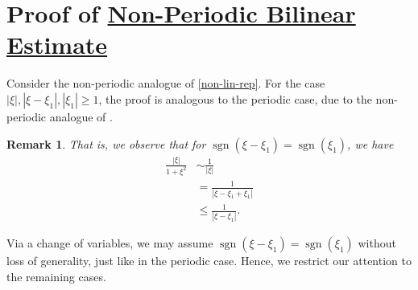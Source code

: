 \documentclass[12pt,reqno]{amsart}
\numberwithin{equation}{section}  %
\renewcommand{\cref}{\Cref}
\DeclareMathOperator{\sgn}{sgn}
\newtheorem{remark}[theorem]{Remark}
\begin{document}
\section{Proof of \hyperref[prop:bil]{Non-Periodic Bilinear Estimate}} 
Consider the non-periodic analogue of \eqref{non-lin-rep}. For the case $|\xi|, |\xi - \xi_{1}|, |\xi_{1}| \ge 1$, the proof is analogous to the periodic case, due to the non-periodic analogue of \cref{rem:key-trick}. 
\begin{framed}
\begin{remark}
\label{rem:key-trick-np}
That is, we observe that
for $\sgn(\xi - \xi_{1}) = \sgn(\xi_{1})$, we have
%
%
\begin{equation*}
\begin{split}
\frac{|\xi|}{1 + \xi^{2}} 
& \sim \frac{1}{|\xi|}
\\
& = \frac{1}{|\xi - \xi_{1} + \xi_{1}|}
\\
& \le \frac{1}{|\xi - \xi_{1}|}.
\end{split}
\end{equation*}
%
\end{remark}
\end{framed}
%
Via a change of variables, we may assume
$\sgn(\xi - \xi_{1}) = \sgn(\xi_{1})$ without loss of generality, just like in the periodic case. Hence, we restrict our attention to the remaining cases.
%
%
\end{document}
